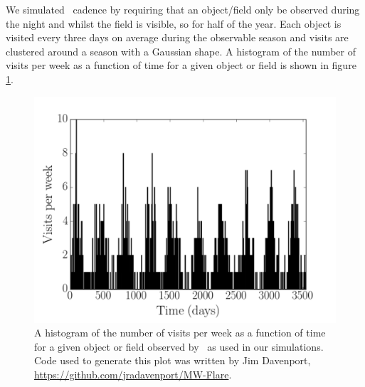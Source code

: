 We simulated \LSST\ cadence by requiring that an object/field only be observed
during the night and whilst the field is visible, so for half of the year.
Each object is visited every three days on average during the observable
season and visits are clustered around a season with a Gaussian shape.
A histogram of the number of visits per week as a function of time for a given
object or field is shown in figure \ref{fig:cadence_hist}.

\begin{figure}
\begin{center}
\includegraphics[width=6in, clip=true]{figures/cadence_hist}
\caption[An \LSST\ cadence histogram.]
{A histogram of the number of visits per week as a function of time
for a given object or field observed by \LSST\ as used in our simulations.
Code used to generate this plot was written by Jim Davenport,
\url{https://github.com/jradavenport/MW-Flare}.}
\label{fig:cadence_hist}
\end{center}
\end{figure}

